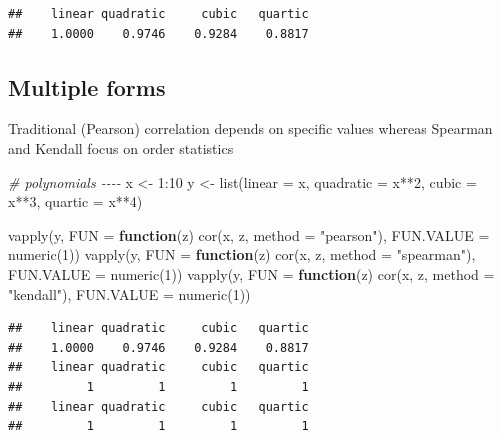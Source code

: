 \documentclass[
]{krantz}
\makeatletter
\newenvironment{Shaded}{\begin{snugshade}}{\end{snugshade}}
\newcommand{\AttributeTok}[1]{\textcolor[rgb]{0.61,0.61,0.61}{#1}}
\newcommand{\CommentTok}[1]{\textcolor[rgb]{0.37,0.37,0.37}{\textit{#1}}}
\newcommand{\ControlFlowTok}[1]{\textcolor[rgb]{0.27,0.27,0.27}{\textbf{#1}}}
\newcommand{\DecValTok}[1]{\textcolor[rgb]{0.06,0.06,0.06}{#1}}
\newcommand{\FunctionTok}[1]{\textcolor[rgb]{0,0,0}{#1}}
\newcommand{\NormalTok}[1]{#1}
\newcommand{\OtherTok}[1]{\textcolor[rgb]{0.37,0.37,0.37}{#1}}
\newcommand{\SpecialCharTok}[1]{\textcolor[rgb]{0,0,0}{#1}}
\newcommand{\StringTok}[1]{\textcolor[rgb]{0.5,0.5,0.5}{#1}}
\newenvironment{kframe}{%
\medskip{}
\setlength{\fboxsep}{.8em}
 \def\at@end@of@kframe{}%
 \ifinner\ifhmode%
  \def\at@end@of@kframe{\end{minipage}}%
  \begin{minipage}{\columnwidth}%
 \fi\fi%
 \def\FrameCommand##1{\hskip\@totalleftmargin \hskip-\fboxsep
 \colorbox{shadecolor}{##1}\hskip-\fboxsep
     \hskip-\linewidth \hskip-\@totalleftmargin \hskip\columnwidth}%
 \MakeFramed {\advance\hsize-\width
   \@totalleftmargin\z@ \linewidth\hsize
   \@setminipage}}%
 {\par\unskip\endMakeFramed%
 \at@end@of@kframe}
\renewenvironment{Shaded}{\begin{kframe}}{\end{kframe}}
\makeatother
\begin{document}
\begin{verbatim}
##    linear quadratic     cubic   quartic 
##    1.0000    0.9746    0.9284    0.8817
\end{verbatim}

\hypertarget{multiple-forms}{%
\subsection{Multiple forms}\label{multiple-forms}}

Traditional (Pearson) correlation depends on specific values whereas Spearman and Kendall focus on order statistics

\begin{Shaded}
\begin{Highlighting}[]
\CommentTok{\# polynomials {-}{-}{-}{-}}
\NormalTok{x }\OtherTok{\textless{}{-}} \DecValTok{1}\SpecialCharTok{:}\DecValTok{10}
\NormalTok{y }\OtherTok{\textless{}{-}} \FunctionTok{list}\NormalTok{(}\AttributeTok{linear =}\NormalTok{ x, }\AttributeTok{quadratic =}\NormalTok{ x}\SpecialCharTok{**}\DecValTok{2}\NormalTok{, }\AttributeTok{cubic =}\NormalTok{ x}\SpecialCharTok{**}\DecValTok{3}\NormalTok{, }\AttributeTok{quartic =}\NormalTok{ x}\SpecialCharTok{**}\DecValTok{4}\NormalTok{)}

\FunctionTok{vapply}\NormalTok{(y, }\AttributeTok{FUN =} \ControlFlowTok{function}\NormalTok{(z) }\FunctionTok{cor}\NormalTok{(x, z, }\AttributeTok{method =} \StringTok{"pearson"}\NormalTok{), }\AttributeTok{FUN.VALUE =} \FunctionTok{numeric}\NormalTok{(}\DecValTok{1}\NormalTok{))}
\FunctionTok{vapply}\NormalTok{(y, }\AttributeTok{FUN =} \ControlFlowTok{function}\NormalTok{(z) }\FunctionTok{cor}\NormalTok{(x, z, }\AttributeTok{method =} \StringTok{"spearman"}\NormalTok{), }\AttributeTok{FUN.VALUE =} \FunctionTok{numeric}\NormalTok{(}\DecValTok{1}\NormalTok{))}
\FunctionTok{vapply}\NormalTok{(y, }\AttributeTok{FUN =} \ControlFlowTok{function}\NormalTok{(z) }\FunctionTok{cor}\NormalTok{(x, z, }\AttributeTok{method =} \StringTok{"kendall"}\NormalTok{), }\AttributeTok{FUN.VALUE =} \FunctionTok{numeric}\NormalTok{(}\DecValTok{1}\NormalTok{))}
\end{Highlighting}
\end{Shaded}

\begin{verbatim}
##    linear quadratic     cubic   quartic 
##    1.0000    0.9746    0.9284    0.8817 
##    linear quadratic     cubic   quartic 
##         1         1         1         1 
##    linear quadratic     cubic   quartic 
##         1         1         1         1
\end{verbatim}
\end{document}
